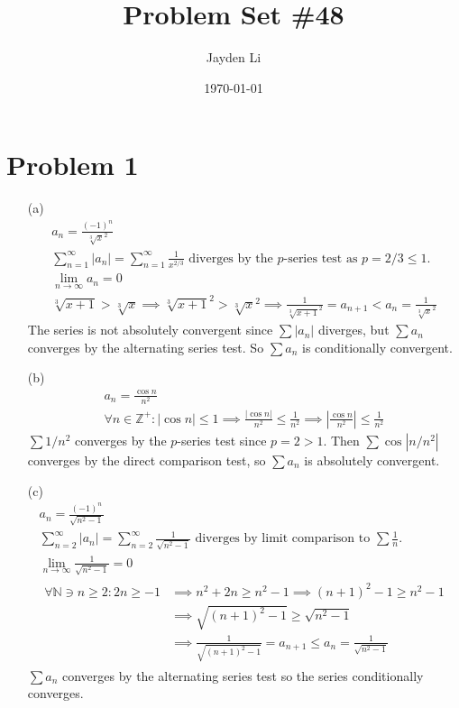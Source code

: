 \documentclass[preview, margin=0.6in]{standalone}
\title{\vspace*{-40pt}Problem Set \#48}
\author{Jayden Li}
\date{\today}
\newcommand*{\problem}[1]{\section*{Problem #1}}
\begin{document}
\fontsize{12pt}{12pt}\selectfont
\setlength{\abovedisplayskip}{\abovedisplayskip/2}
\setlength{\belowdisplayskip}{\belowdisplayskip/2}
\setlength{\parindent}{0pt}
\setlength{\parskip}{2ex plus 0.5ex minus 0.2ex}
\maketitle

\problem{1}
\begin{itemize}
	\item[(a)]
		\begin{gather*}
			a_n=\frac{(-1)^n}{\sqrt[3]{x}^2} \\ 
			\sum_{n=1}^{\infty}|a_n|
			=\sum_{n=1}^{\infty}\frac{1}{x^{2/3}} \text{ diverges by the $p$-series test as $p=2/3\leq1$.} \\
			\lim_{n\to\infty}a_n=0 \\
			\sqrt[3]{x+1}>\sqrt[3]{x}
			\implies \sqrt[3]{x+1}^2>\sqrt[3]{x}^2
			\implies \frac{1}{\sqrt[3]{x+1}^2}=a_{n+1}<a_n=\frac{1}{\sqrt[3]{x}^2}
		\end{gather*}
		The series is not absolutely convergent since $\sum |a_n|$ diverges, but $\sum a_n$ converges by the alternating series test. So $\sum a_n$ is conditionally convergent.
	
	\item[(b)]
		\begin{gather*}
		    a_n=\frac{\cos n}{n^2} \\
			\forall n\in \mathbb Z^+:
			\left|\cos n\right|\leq1
			\implies \frac{\left|\cos n\right|}{n^2}\leq\frac{1}{n^2}
			\implies \left|\frac{\cos n}{n^2}\right|\leq\frac{1}{n^2}
		\end{gather*}
		$\sum 1/n^2$ converges by the $p$-series test since $p=2>1$. Then $\sum \cos \left|n/n^2\right|$ converges by the direct comparison test, so $\sum a_n$ is absolutely convergent.
	
	\item[(c)]
		\begin{gather*}
		    a_n=\frac{(-1)^n}{\sqrt{n^2-1}} \\
			\sum_{n=2}^{\infty}|a_n|
			=\sum_{n=2}^{\infty}\frac{1}{\sqrt{n^2-1}}
			\text{ diverges by limit comparison to $\sum \frac1n$.} \\
			\lim_{n\to\infty}\frac{1}{\sqrt{n^2-1}}=0 \\
			\begin{aligned}
				\forall \mathbb N \ni n \geq 2 :
				2n\geq -1
				&\implies n^2+2n\geq n^2-1
				\implies (n+1)^2-1\geq n^2-1 \\
				&\implies \sqrt{(n+1)^2-1}\geq \sqrt{n^2-1} \\
				&\implies \frac{1}{\sqrt{(n+1)^2-1}}=a_{n+1}\leq a_n=\frac{1}{\sqrt{n^2-1}}
			\end{aligned}
		\end{gather*}
		$\sum a_n$ converges by the alternating series test so the series conditionally converges.
\end{itemize}
\end{document}
